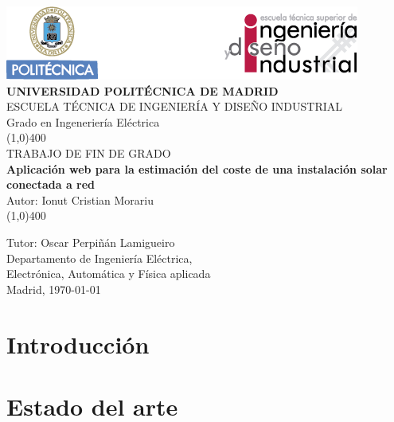 \documentclass[11pt]{report}
\begin{document}
\begin{titlepage}



\begin{center}
	\includegraphics[scale=1]{cabecera}\\
	\vspace*{1cm}
	\Large{\textbf{\MakeUppercase{Universidad Politécnica de Madrid}}}\\[3mm]
	\Large{{\MakeUppercase{Escuela técnica de ingeniería y diseño industrial}}}\\[3mm]
	\Large {Grado en Ingeneriería Eléctrica}\\
	\vfill
	\line(1,0){400}\\
	\Large{{\MakeUppercase{Trabajo de fin de grado}}}\\
	\Huge{\textbf{Aplicación web para la estimación del coste de una instalación solar conectada a red}}\\[5mm]
	\Large{Autor: Ionut Cristian Morariu}\\
	\line(1,0){400}\\
	\vfill
\end{center}
\begin{flushright}
\Large {Tutor: Oscar Perpiñán Lamigueiro}\\[3mm]
\Large{Departamento de Ingeniería Eléctrica,\\ Electrónica, Automática y Física aplicada}\\[10mm]
Madrid, \today
\end{flushright}

\end{titlepage}

\renewcommand{\baselinestretch}{1.5} %
\renewcommand{\labelitemi}{\textbullet}

\tableofcontents
\thispagestyle{empty}
\clearpage

\setcounter{page}{1}


\chapter{Introducción}


\chapter{Estado del arte}

\end{document}

